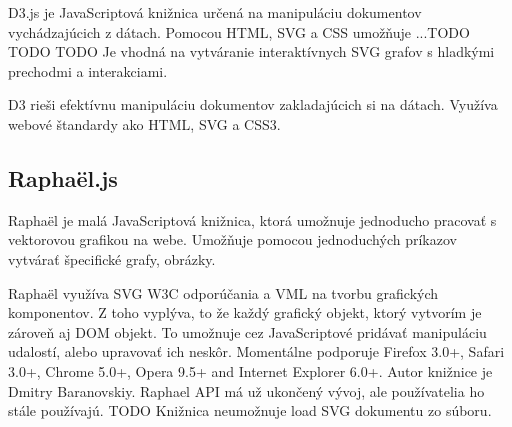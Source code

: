 D3.js je JavaScriptová knižnica určená na manipuláciu dokumentov vychádzajúcich z dátach. Pomocou \acs{HTML}, \acs{SVG} a \acs{CSS} umožňuje ...TODO TODO
TODO %
Je vhodná na vytváranie interaktívnych SVG grafov s hladkými prechodmi a interakciami. 



D3 rieši efektívnu manipuláciu dokumentov zakladajúcich si na dátach. Využíva webové štandardy ako \acs{HTML}, \acs{SVG} a \acs{CSS}3. \cite{d3js}


\subsection{Raphaël.js}

Raphaël je malá JavaScriptová knižnica, ktorá umožnuje jednoducho pracovať s vektorovou grafikou na webe. Umožňuje pomocou jednoduchých príkazov vytvárať špecifické grafy, obrázky. 

Raphaël využíva \acs{SVG} \acs{W3C} odporúčania a \acs{VML} na tvorbu grafických komponentov. Z toho vyplýva, to že každý grafický objekt, ktorý vytvorím je zároveň aj DOM objekt. To umožnuje cez JavaScriptové pridávať manipuláciu udalostí, alebo upravovať ich neskôr.
Momentálne podporuje Firefox 3.0+, Safari 3.0+, Chrome 5.0+, Opera 9.5+ and Internet Explorer 6.0+.\cite{Raphael}
Autor knižnice je Dmitry Baranovskiy. Raphael API má už ukončený vývoj, ale používatelia ho stále používajú. TODO  
Knižnica neumožnuje load SVG dokumentu zo súboru. 

